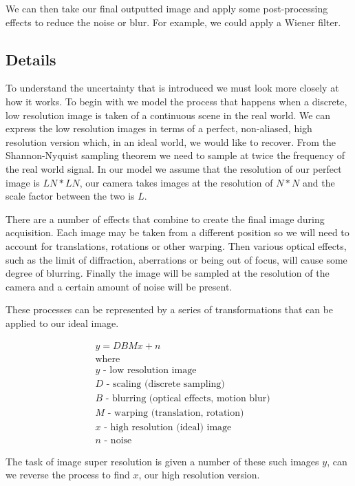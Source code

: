 We can then take our final outputted image and apply some post-processing effects to reduce the noise or blur. For example, we could apply a Wiener filter\cite{wienerfilter}.

\subsection*{Details}
To understand the uncertainty that is introduced we must look more closely at how it works.
To begin with we model the process that happens when a discrete, low resolution image is taken of a continuous scene in the real world. We can express the low resolution images in terms of a perfect, non-aliased, high resolution version which, in an ideal world, we would like to recover. From the Shannon-Nyquist sampling theorem we need to sample at twice the frequency of the real world signal\cite{shannonnyquist}. In our model we assume that the resolution of our perfect image is $LN * LN$, our camera takes images at the resolution of $N * N$ and the scale factor between the two is $L$.

There are a number of effects that combine to create the final image during acquisition. Each image may be taken from a different position so we will need to account for translations, rotations or other warping. Then various optical effects, such as the limit of diffraction, aberrations or being out of focus, will cause some degree of blurring. Finally the image will be sampled at the resolution of the camera and a certain amount of noise will be present.

These processes can be represented by a series of transformations that can be applied to our ideal image.

\begin{align*} 
& y = DBMx + n \nonumber \\ 
& \text{where} \\
& y \text{ - low resolution image} \nonumber \\
& D \text{ - scaling (discrete sampling)} \nonumber \\
& B \text{ - blurring (optical effects, motion blur)} \nonumber \\
& M \text{ - warping (translation, rotation)} \nonumber \\
& x \text{ - high resolution (ideal) image} \nonumber \\
& n \text{ - noise} \nonumber
\end{align*}

The task of image super resolution is given a number of these such images $y$, can we reverse the process to find $x$, our high resolution version.

